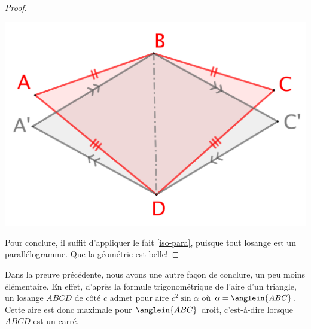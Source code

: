 \begin{proof}
    \begin{center}
        \includegraphics[scale=.4]{convex-isopaire.png}
    \end{center}


    Pour conclure, il suffit d'appliquer le fait \ref{iso-para}, puisque tout losange est un parallélogramme. Que la géométrie est belle!
\end{proof}




\begin{remark}
    Dans la preuve précédente, nous avons une autre façon de conclure, un peu moins élémentaire.
    En effet, d'après la formule trigonométrique de l'aire d'un triangle,
    un losange $ABCD$ de côté $c$ admet pour aire $c^2 \sin \alpha$ où $\alpha = \anglein{ABC}$.
    Cette aire est donc maximale pour $\anglein{ABC}$ droit, c'est-à-dire lorsque $ABCD$ est un carré.
\end{remark}
